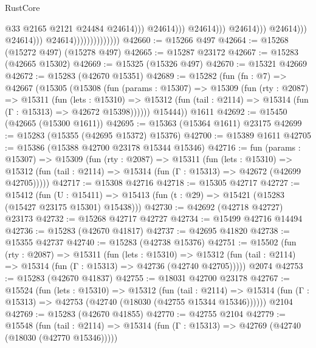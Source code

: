 \begin{lexlean}{RustCore}
\begin{coremodule}
                                                                    @33
                                                                    @2165
                                                                    @2121
                                                                    @24484
                                                                    @24614)))
                                                              @24614)))
                                                        @24614)))
                                                  @24614)))
                                            @24614)))
                                      @24614)))
                                @24614))))))))))))))
@42660 := @15266 @497
@42664 := @15268 (@15272 @497) (@15278 @497)
@42665 := @15287 @23172
@42667 := @15283 (@42665 @15302)
@42669 := @15325 (@15326 @497)
@42670 := @15321 @42669
@42672 := @15283 (@42670 @15351)
@42689 := @15282
    (fun (fn : @7) =>
    @42667
      (@15305
        (@15308
          (fun (params : @15307) =>
          @15309
            (fun (rty : @2087) =>
            @15311
              (fun (lets : @15310) =>
              @15312 (fun (tail : @2114) => @15314 (fun (Γ : @15313) => @42672 @15398))))))
        @15444))
    @1611
@42692 := @15450 (@42665 (@15300 @1611))
@42695 := @15363 (@15364 @1611) @23175
@42699 := @15283 (@15355 (@42695 @15372) @15376)
@42700 := @15389 @1611
@42705 := @15386 (@15388 @42700 @23178 @15344 @15346)
@42716 := fun (params : @15307) =>
  @15309
    (fun (rty : @2087) =>
    @15311
      (fun (lets : @15310) =>
      @15312 (fun (tail : @2114) => @15314 (fun (Γ : @15313) => @42672 (@42699 @42705)))))
@42717 := @15308 @42716
@42718 := @15305 @42717
@42727 := @15412
    (fun (U : @15411) => @15413 (fun (t : @29) => @15421 (@15283 (@15427 @23175 @15301) @15438)))
@42730 := @42692 (@42718 @42727) @23173
@42732 := @15268 @42717 @42727
@42734 := @15499 @42716 @14494
@42736 := @15283 (@42670 @41817)
@42737 := @42695 @41820
@42738 := @15355 @42737
@42740 := @15283 (@42738 @15376)
@42751 := @15502
    (fun (rty : @2087) =>
    @15311
      (fun (lets : @15310) =>
      @15312 (fun (tail : @2114) => @15314 (fun (Γ : @15313) => @42736 (@42740 @42705)))))
    @2074
@42753 := @15283 (@42670 @41837)
@42755 := @18031 @42700 @23178
@42767 := @15524
    (fun (lets : @15310) =>
    @15312
      (fun (tail : @2114) =>
      @15314 (fun (Γ : @15313) => @42753 (@42740 (@18030 (@42755 @15344 @15346))))))
    @2104
@42769 := @15283 (@42670 @41855)
@42770 := @42755 @2104
@42779 := @15548
    (fun (tail : @2114) => @15314 (fun (Γ : @15313) => @42769 (@42740 (@18030 (@42770 @15346)))))

\end{coremodule}
\end{lexlean}

